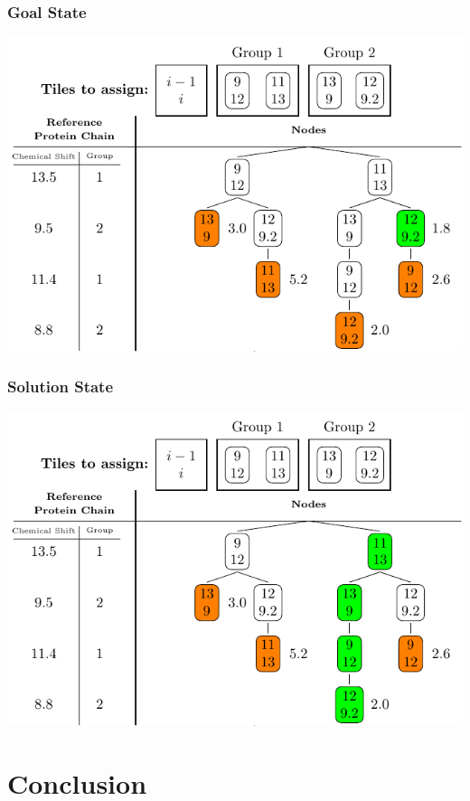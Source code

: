 \documentclass{beamer}
\begin{document}
\begin{frame}
	\frametitle{Goal State}
	\vspace{-.5cm} 
	\center
	\includegraphics[width=.9\textwidth]{tilePlacement/step9}
\end{frame}

\begin{frame}
	\frametitle{Solution State}
	\vspace{-.5cm} 
	\center
	\includegraphics[width=.9\textwidth]{tilePlacement/step10}
\end{frame}

\section{Conclusion}

\end{document}

